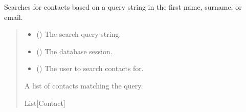\documentclass[letterpaper,10pt,english]{sphinxmanual}
\begin{document}
\begin{fulllineitems}
\label{\detokenize{index:src.repository.contacts.search_contacts}}
\pysigstartsignatures
{}
\pysigstopsignatures
\sphinxAtStartPar
Searches for contacts based on a query string in the first name, surname, or email.
\begin{quote}\begin{description}
\begin{itemize}
\item {} 
\sphinxAtStartPar
{} () \textendash{} The search query string.

\item {} 
\sphinxAtStartPar
{} () \textendash{} The database session.

\item {} 
\sphinxAtStartPar
{} () \textendash{} The user to search contacts for.

\end{itemize}

\sphinxAtStartPar
A list of contacts matching the query.

\sphinxAtStartPar
List{[}Contact{]}

\end{description}\end{quote}

\end{fulllineitems}

\end{document}
